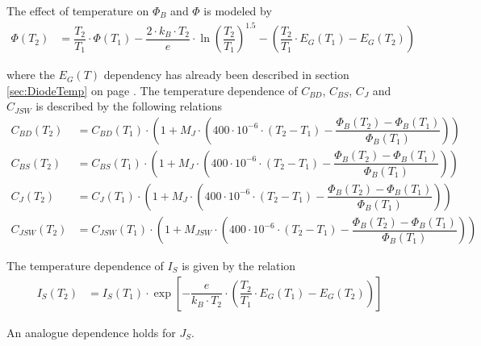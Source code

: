The effect of temperature on $\Phi_B$ and $\Phi$ is modeled by
\begin{align}
\Phi\left(T_2\right)  &= \dfrac{T_2}{T_1}\cdot \Phi\left(T_1\right) - \dfrac{2\cdot k_B\cdot T_2}{e} \cdot \ln{\left(\dfrac{T_2}{T_1}\right)^{1.5}} - \left(\dfrac{T_2}{T_1} \cdot E_G\left(T_1\right) - E_G\left(T_2\right)\right)
\end{align}

where the $E_G\left(T\right)$ dependency has already been described in
section \ref{sec:DiodeTemp} on page \pageref{sec:DiodeTemp}.  The
temperature dependence of $C_{BD}$, $C_{BS}$, $C_{J}$ and $C_{JSW}$ is
described by the following relations
\begin{align}
C_{BD}\left(T_2\right) &= C_{BD}\left(T_1\right)\cdot\left(1 + M_J\cdot\left(400\cdot 10^{-6} \cdot\left(T_2 - T_1\right) - \dfrac{\Phi_B\left(T_2\right) - \Phi_B\left(T_1\right)}{\Phi_B\left(T_1\right)}\right)\right)\\
C_{BS}\left(T_2\right) &= C_{BS}\left(T_1\right)\cdot\left(1 + M_J\cdot\left(400\cdot 10^{-6} \cdot\left(T_2 - T_1\right) - \dfrac{\Phi_B\left(T_2\right) - \Phi_B\left(T_1\right)}{\Phi_B\left(T_1\right)}\right)\right)\\
C_{J}\left(T_2\right) &= C_{J}\left(T_1\right)\cdot\left(1 + M_J\cdot\left(400\cdot 10^{-6} \cdot\left(T_2 - T_1\right) - \dfrac{\Phi_B\left(T_2\right) - \Phi_B\left(T_1\right)}{\Phi_B\left(T_1\right)}\right)\right)\\
C_{JSW}\left(T_2\right) &= C_{JSW}\left(T_1\right)\cdot\left(1 + M_{JSW}\cdot\left(400\cdot 10^{-6} \cdot\left(T_2 - T_1\right) - \dfrac{\Phi_B\left(T_2\right) - \Phi_B\left(T_1\right)}{\Phi_B\left(T_1\right)}\right)\right)
\end{align}

The temperature dependence of $I_S$ is given by the relation
\begin{align}
I_S\left(T_2\right) &= I_S\left(T_1\right)\cdot \exp{\left[-\dfrac{e}{k_B\cdot T_2}\cdot \left(\dfrac{T_2}{T_1}\cdot E_G\left(T_1\right) - E_G\left(T_2\right)\right)\right]}
\end{align}

An analogue dependence holds for $J_S$.
